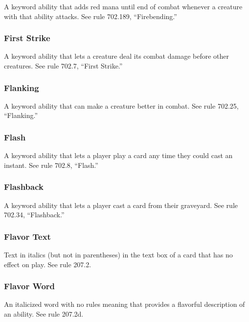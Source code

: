 {{{{{{{{{A keyword ability that adds red mana until end of combat whenever a creature with that ability attacks. See rule 702.189, “Firebending.”

\subsubsection*{First Strike}

A keyword ability that lets a creature deal its combat damage before other creatures. See rule 702.7, “First Strike.”

\subsubsection*{Flanking}

A keyword ability that can make a creature better in combat. See rule 702.25, “Flanking.”

\subsubsection*{Flash}

A keyword ability that lets a player play a card any time they could cast an instant. See rule 702.8, “Flash.”

\subsubsection*{Flashback}

A keyword ability that lets a player cast a card from their graveyard. See rule 702.34, “Flashback.”

\subsubsection*{Flavor Text}

Text in italics (but not in parentheses) in the text box of a card that has no effect on play. See rule 207.2.

\subsubsection*{Flavor Word}

An italicized word with no rules meaning that provides a flavorful description of an ability. See rule 207.2d.

}}}}}}}}}
